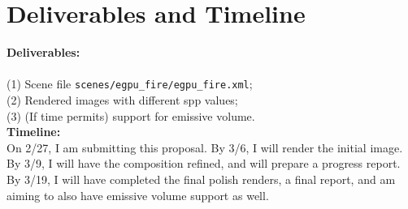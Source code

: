 \documentclass{article}
\begin{document}
\section{Deliverables and Timeline}

\hspace{.5cm}\textbf{Deliverables:}  \\
\\
(1) Scene file \texttt{scenes/egpu\_fire/egpu\_fire.xml}; 
\\
(2) Rendered images with different spp values; 
\\
(3) (If time permits) support for emissive volume.\\

\textbf{Timeline:} \\

On 2/27, I am submitting this proposal.
By 3/6, I will render the initial image. By 3/9, I will have the composition refined, and will prepare a progress report. By 3/19, I will have completed the final polish renders, a final report, and am aiming to also have emissive volume support as well.




\end{document}
